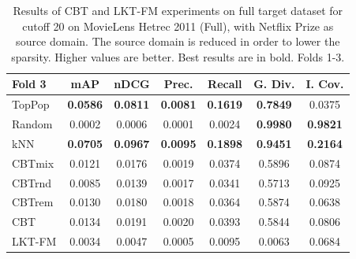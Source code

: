 \begin{table}[hbt]
\begin{tabulary}{\textwidth}{|L|CCCCCC|}
\hline
\hline
Fold 3 & mAP & nDCG & Prec. & Recall & G. Div. & I. Cov. \\
\hline
TopPop & \textbf{0.0586} &\textbf{0.0811} &\textbf{0.0081} &\textbf{0.1619} &\textbf{0.7849} & 0.0375 \\
Random & 0.0002 & 0.0006 & 0.0001 & 0.0024 &\textbf{0.9980} & \textbf{0.9821} \\
kNN & \textbf{0.0705} &\textbf{0.0967} &\textbf{0.0095} &\textbf{0.1898} &\textbf{0.9451} & \textbf{0.2164} \\
CBTmix & 0.0121 & 0.0176 & 0.0019 & 0.0374 & 0.5896 & 0.0874 \\
CBTrnd & 0.0085 & 0.0139 & 0.0017 & 0.0341 & 0.5713 & 0.0925 \\
CBTrem & 0.0130 & 0.0180 & 0.0018 & 0.0364 & 0.5874 & 0.0638 \\
CBT & 0.0134 & 0.0191 & 0.0020 & 0.0393 & 0.5844 & 0.0806 \\
LKT-FM & 0.0034 &           0.0047 &           0.0005 &           0.0095 &                                            0.0063 &                                            0.0684 \\
\hline
\end{tabulary}
\caption{Results of CBT and LKT-FM experiments on full target dataset for cutoff 20 on MovieLens Hetrec 2011 (Full), with Netflix Prize as source domain. The source domain is reduced in order to lower the sparsity. Higher values are better. Best results are in bold. Folds 1-3.}
\end{table}

